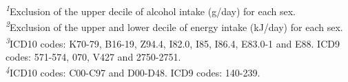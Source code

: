 \begin{table*}[!t]
\begin{minipage}{\linewidth}
\textsuperscript{\textit{1}}Exclusion of the upper decile of alcohol intake (g/day) for each sex.\\
\textsuperscript{\textit{2}}Exclusion of the upper and lower decile of energy intake (kJ/day) for each sex.\\
\textsuperscript{\textit{3}}ICD10 codes: K70-79, B16-19, Z94.4, I82.0, I85, I86.4, E83.0-1 and E88. ICD9 codes: 571-574, 070, V427 and 2750-2751.\\
\textsuperscript{\textit{4}}ICD10 codes: C00-C97 and D00-D48. ICD9 codes: 140-239.\\
\end{minipage}
\end{table*}

